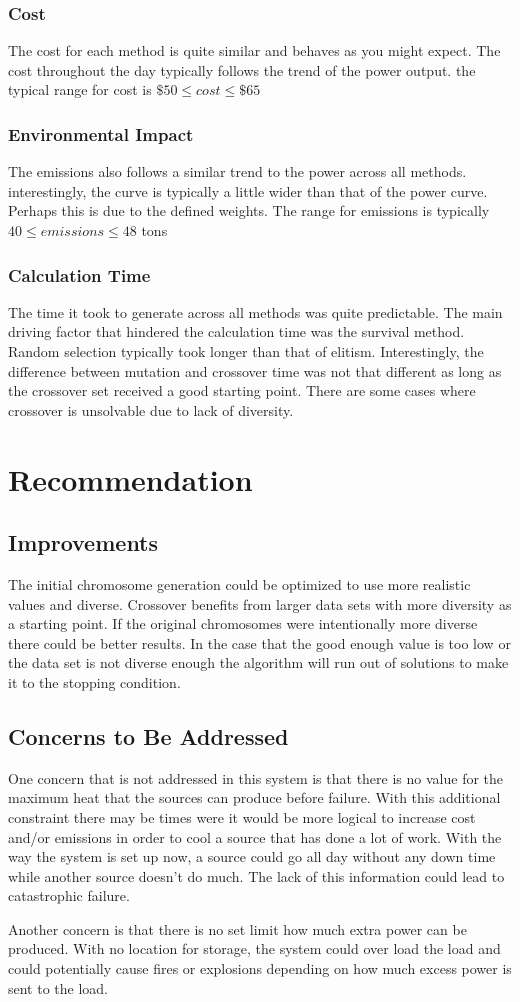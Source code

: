 \documentclass{article}
\begin{document}
    \subsubsection{Cost}
        The cost for each method is quite similar and behaves as you might expect.  The cost throughout the day typically follows the trend of the power output.
        the typical range for cost is \(\$50 \leq cost \leq \$65\)

    \subsubsection{Environmental Impact}
        The emissions also follows a similar trend to the power across all methods.  interestingly, the curve is typically a little wider than that of the power curve. Perhaps this is due to the defined weights. The range for emissions is typically \(40 \leq emissions \leq 48 \) tons

    \subsubsection{Calculation Time}
        The time it took to generate across all methods was quite predictable.  
        The main driving factor that hindered the calculation time was the survival method.  Random selection typically took longer than that of elitism.  Interestingly, the difference between mutation and crossover time was not that different as long as the crossover set received a good starting point. There are some cases where crossover is unsolvable due to lack of diversity.

\section{Recommendation}
    \subsection{Improvements}
    The initial chromosome generation could be optimized to use more realistic values and diverse.  Crossover benefits from larger data sets with more diversity as a starting point.  If the original chromosomes were intentionally more diverse there could be better results.  In the case that the good enough value is too low or the data set is not diverse enough the algorithm will run out of solutions to make it to the stopping condition.


    \subsection{Concerns to Be Addressed}
    One concern that is not addressed in this system is that there is no value for the maximum heat that the sources can produce before failure.  With this additional constraint there may be times were it would be more logical to increase cost and/or emissions in order to cool a source that has done a lot of work.  With the way the system is set up now, a source could go all day without any down time while another source doesn't do much.  The lack of this information could lead to catastrophic failure.

    Another concern is that there is no set limit how much extra power can be produced.  With no location for storage, the system could over load the load and could potentially cause fires or explosions depending on how much excess power is sent to the load.
\end{document}
